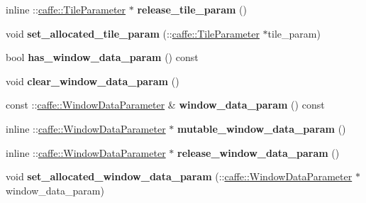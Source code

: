 \begin{DoxyCompactItemize}
\mbox{\label{classcaffe_1_1_layer_parameter_ab0d0722bb336592e7f49dc73ee5ba736}} 
inline \+::\mbox{\hyperlink{classcaffe_1_1_tile_parameter}{caffe\+::\+Tile\+Parameter}} $\ast$ {\bfseries release\+\_\+tile\+\_\+param} ()
\item 
\mbox{\label{classcaffe_1_1_layer_parameter_a005767f7059d3a9a653741fdab34caec}} 
void {\bfseries set\+\_\+allocated\+\_\+tile\+\_\+param} (\+::\mbox{\hyperlink{classcaffe_1_1_tile_parameter}{caffe\+::\+Tile\+Parameter}} $\ast$tile\+\_\+param)
\item 
\mbox{\label{classcaffe_1_1_layer_parameter_a48a4930f18346ae97b59273cb4ce117f}} 
bool {\bfseries has\+\_\+window\+\_\+data\+\_\+param} () const
\item 
\mbox{\label{classcaffe_1_1_layer_parameter_ab0b57b28ad899d3dc8ac07644d188500}} 
void {\bfseries clear\+\_\+window\+\_\+data\+\_\+param} ()
\item 
\mbox{\label{classcaffe_1_1_layer_parameter_aa038b0ce4392ce825df940e92d43bab2}} 
const \+::\mbox{\hyperlink{classcaffe_1_1_window_data_parameter}{caffe\+::\+Window\+Data\+Parameter}} \& {\bfseries window\+\_\+data\+\_\+param} () const
\item 
\mbox{\label{classcaffe_1_1_layer_parameter_a322d2cc10e2c8ad5d5b88abacb542bf2}} 
inline \+::\mbox{\hyperlink{classcaffe_1_1_window_data_parameter}{caffe\+::\+Window\+Data\+Parameter}} $\ast$ {\bfseries mutable\+\_\+window\+\_\+data\+\_\+param} ()
\item 
\mbox{\label{classcaffe_1_1_layer_parameter_a5ca8963b8ec6cbc64dacfbc3a97848ca}} 
inline \+::\mbox{\hyperlink{classcaffe_1_1_window_data_parameter}{caffe\+::\+Window\+Data\+Parameter}} $\ast$ {\bfseries release\+\_\+window\+\_\+data\+\_\+param} ()
\item 
\mbox{\label{classcaffe_1_1_layer_parameter_a40c89907080b5310a11c059e67c9bfc9}} 
void {\bfseries set\+\_\+allocated\+\_\+window\+\_\+data\+\_\+param} (\+::\mbox{\hyperlink{classcaffe_1_1_window_data_parameter}{caffe\+::\+Window\+Data\+Parameter}} $\ast$window\+\_\+data\+\_\+param)

\end{DoxyCompactItemize}
